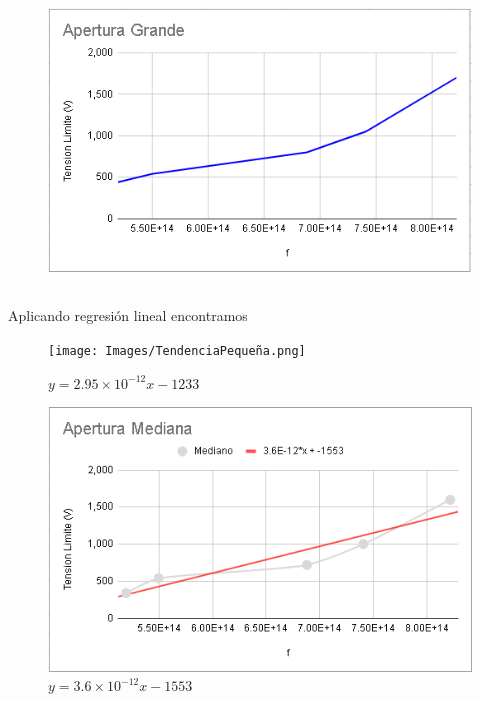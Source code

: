 \documentclass[letterpaper, 12pt]{article}
\begin{document}
\begin{figure}[H]
      \begin{center}
            \includegraphics[width=.7\linewidth]{Images/AperturaGrande.png}
            \caption{}
      \end{center}
\end{figure}

\subsection{}

Aplicando regresión lineal encontramos

\begin{figure}[H]
      \begin{center}
            \texttt{[image: Images/TendenciaPequeña.png]}
            \caption{$y = 2.95 \times 10^{-12}x - 1233$}
      \end{center}
\end{figure}

\begin{figure}[H]
      \begin{center}
            \includegraphics[width=.7\linewidth]{Images/TendenciaMediana.png}
            \caption{$y = 3.6 \times 10^{-12}x - 1553$}
      \end{center}
\end{figure}
\end{document}

